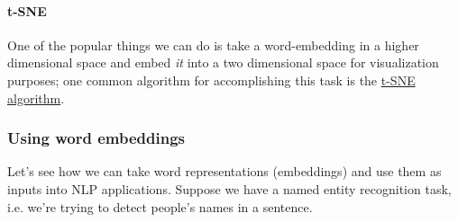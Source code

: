\documentclass[12pt]{article}
\begin{document}
\paragraph{t-SNE} One of the popular things we can do is take a word-embedding
in a higher dimensional space and embed \emph{it} into a two dimensional space for visualization purposes; one common algorithm for accomplishing this task is the \href{https://en.wikipedia.org/wiki/T-distributed_stochastic_neighbor_embedding}{t-SNE   algorithm}.

\subsubsection{Using word embeddings} Let's see how we can take word representations (embeddings) and use them as inputs into NLP applications. Suppose we have a named entity recognition task, i.e. we're trying to detect people's names in a sentence.
\end{document}
